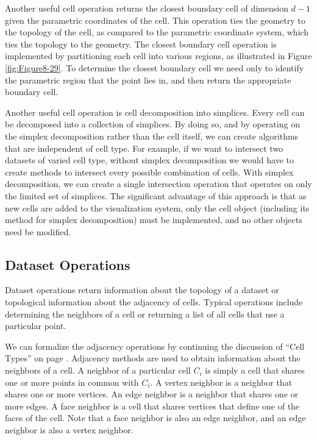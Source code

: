 Another useful cell operation returns the closest boundary cell of dimension $d-1$ given the parametric coordinates of the cell. This operation ties the geometry to the topology of the cell, as compared to the parametric coordinate system, which ties the topology to the geometry. The closest boundary cell operation is implemented by partitioning each cell into various regions, as illustrated in Figure \ref{fig:Figure8-29}. To determine the closest boundary cell we need only to identify the parametric region that the point lies in, and then return the appropriate boundary cell.

Another useful cell operation is cell decomposition into simplices. Every cell can be decomposed into a collection of simplices. By doing so, and by operating on the simplex decomposition rather than the cell itself, we can create algorithms that are independent of cell type. For example, if we want to intersect two datasets of varied cell type, without simplex decomposition we would have to create methods to intersect every possible combination of cells. With simplex decomposition, we can create a single intersection operation that operates on only the limited set of simplices. The significant advantage of this approach is that as new cells are added to the visualization system, only the cell object (including its method for simplex decomposition) must be implemented, and no other objects need be modified.

\subsection{Dataset Operations}

Dataset operations return information about the topology of a dataset or topological information about the adjacency of cells. Typical operations include determining the neighbors of a cell or returning a list of all cells that use a particular point.

We can formalize the adjacency operations by continuing the discussion of ``Cell Types'' on page \pageref{sec:cell_types}. Adjacency methods are used to obtain information about the neighbors of a cell. A neighbor of a particular cell $C_i$ is simply a cell that shares one or more points in common with $C_i$. A vertex neighbor is a neighbor that shares one or more vertices. An edge neighbor is a neighbor that shares one or more edges. A face neighbor is a cell that shares vertices that define one of the faces of the cell. Note that a face neighbor is also an edge neighbor, and an edge neighbor is also a vertex neighbor.

